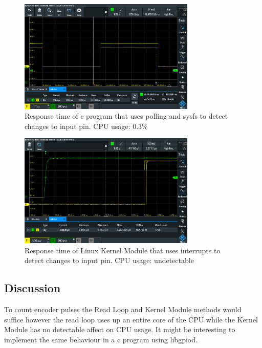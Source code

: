 \documentclass{article}
\begin{document}
\begin{figure}[H]
    \centering
    \includegraphics[width=0.75\textwidth]{Project4KernelSpaceEncoderDriver/Part2_3_poll.PNG}
    \caption{Response time of c program that uses polling and sysfs to detect changes to input pin. CPU usage: 0.3\%}
    \label{fig:poll}
\end{figure}

\begin{figure}[H]
    \centering
    \includegraphics[width=0.75\textwidth]{Project4KernelSpaceEncoderDriver/part2_4_kernel.PNG}
    \caption{Response time of Linux Kernel Module that uses interrupts to detect changes to input pin. CPU usage: undetectable}
    \label{fig:kernel}
\end{figure}





\subsection{Discussion}
To count encoder pulses the Read Loop and Kernel Module methods would suffice however the read loop uses up an entire core of the CPU while the Kernel Module has no detectable affect on CPU usage. It might be interesting to implement the same behaviour in a c program using libgpiod.
\end{document}
